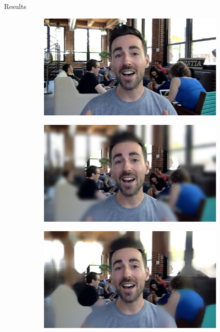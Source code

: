 \documentclass[aspectratio=169,t,xcolor={dvipsnames}]{beamer}
\begin{document}
\begin{frame}{Results}
\begin{figure}[h]
    \centering
    \begin{subfigure}{.3\textwidth}
        \centering
        \includegraphics[width=0.9\linewidth]{../../python/person}
        \label{subfig:input}
    \end{subfigure}\hfill
    \begin{subfigure}{.3\textwidth}
        \centering
        \includegraphics[width=0.9\linewidth]{../../python/and_gauss_81}
        \label{subfig:input}
    \end{subfigure}\hfill
    \begin{subfigure}{.3\textwidth}
        \centering
        \includegraphics[width=0.9\linewidth]{../../python/and_median_81}

\end{subfigure}
\end{figure}
\end{frame}
\end{document}
